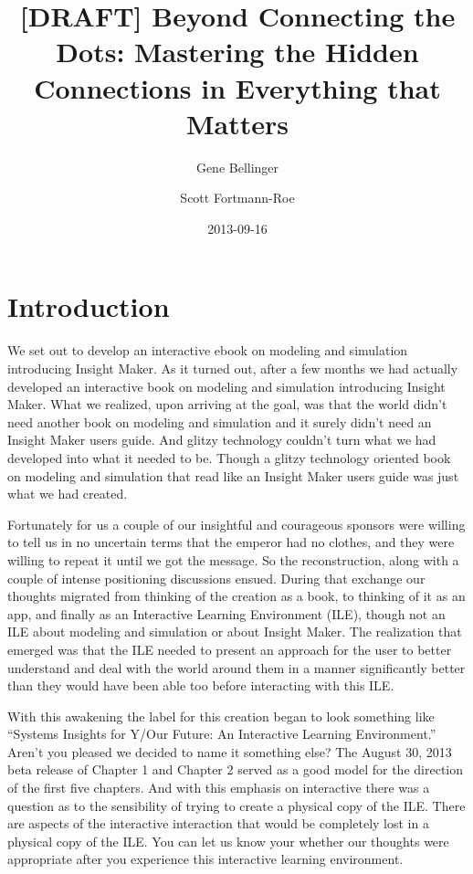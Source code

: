 \documentclass[]{memoir}
\title{{[}DRAFT{]} Beyond Connecting the Dots: Mastering the Hidden Connections
       in Everything that Matters}
\author{Gene Bellinger \and Scott Fortmann-Roe}
\date{2013-09-16}
\begin{document}
\maketitle

{
\hypersetup{linkcolor=black}
\setcounter{tocdepth}{1}
\tableofcontents
}
\section{Introduction}

We set out to develop an interactive ebook on modeling and simulation
introducing Insight Maker. As it turned out, after a few months we had
actually developed an interactive book on modeling and simulation
introducing Insight Maker. What we realized, upon arriving at the goal,
was that the world didn't need another book on modeling and simulation
and it surely didn't need an Insight Maker users guide. And glitzy
technology couldn't turn what we had developed into what it needed to
be. Though a glitzy technology oriented book on modeling and simulation
that read like an Insight Maker users guide was just what we had
created.

Fortunately for us a couple of our insightful and courageous sponsors
were willing to tell us in no uncertain terms that the emperor had no
clothes, and they were willing to repeat it until we got the message. So
the reconstruction, along with a couple of intense positioning
discussions ensued. During that exchange our thoughts migrated from
thinking of the creation as a book, to thinking of it as an app, and
finally as an Interactive Learning Environment (ILE), though not an ILE
about modeling and simulation or about Insight Maker. The realization
that emerged was that the ILE needed to present an approach for the user
to better understand and deal with the world around them in a manner
significantly better than they would have been able too before
interacting with this ILE.

With this awakening the label for this creation began to look something
like ``Systems Insights for Y/Our Future: An Interactive Learning
Environment.'' Aren't you pleased we decided to name it something else?
The August 30, 2013 beta release of Chapter 1 and Chapter 2 served as a
good model for the direction of the first five chapters. And with this
emphasis on interactive there was a question as to the sensibility of
trying to create a physical copy of the ILE. There are aspects of the
interactive interaction that would be completely lost in a physical copy
of the ILE. You can let us know your whether our thoughts were
appropriate after you experience this interactive learning environment.
\end{document}
